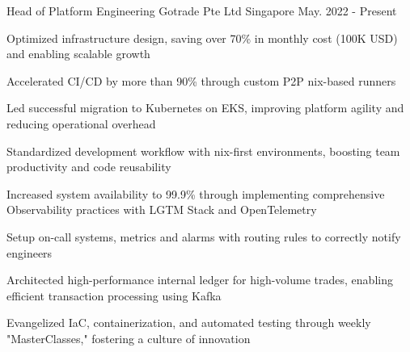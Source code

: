 

\begin{cventries}


    \cventry
    {Head of Platform Engineering} %
    {Gotrade Pte Ltd} %
    {Singapore} %
    {May. 2022 - Present} %
    {
    \begin{cvitems} %
        \item {Optimized infrastructure design, saving over 70\% in monthly cost (100K USD) and enabling scalable growth}
        \item {Accelerated CI/CD by more than 90\% through custom P2P nix-based runners}
        \item {Led successful migration to Kubernetes on EKS, improving platform agility and reducing operational overhead}
        \item {Standardized development workflow with nix-first environments, boosting team productivity and code reusability}
        \item {Increased system availability to 99.9\% through implementing comprehensive Observability practices with LGTM Stack and OpenTelemetry}
        \item {Setup on-call systems, metrics and alarms with routing rules to correctly notify engineers}
        \item {Architected high-performance internal ledger for high-volume trades, enabling efficient transaction processing using Kafka}
        \item {Evangelized IaC, containerization, and automated testing through weekly "MasterClasses," fostering a culture of innovation}
    \end{cvitems}
    }


\end{cventries}
